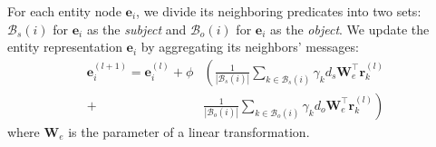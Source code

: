 For each entity node $\mathbf{e}_i$, we divide its neighboring predicates into two sets: $\mathcal{B}_s(i)$ for $\mathbf{e}_i$ as the \textit{subject} and $\mathcal{B}_o(i)$ for $\mathbf{e}_i$ as the \textit{object}.
We update the entity representation $\mathbf{e}_i$ by aggregating its neighbors' messages:
\begin{align}
    \mathbf{e}_i^{(l+1)} = \mathbf{e}_i^{(l)}  +\phi & \left( \frac{1}{|\mathcal{B}_s(i)|}\sum_{k\in\mathcal{B}_{s}(i)} \gamma_{k}  d_{s} \mathbf{W}_e^\intercal\mathbf{r}^{(l)}_{k} \right.\\
     + &\left. \frac{1}{|\mathcal{B}_o(i)|}\sum_{k\in\mathcal{B}_{o}(i)} \gamma_{k}  d_{o}   \mathbf{W}_e^\intercal\mathbf{r}^{(l)}_{k} \right)     
\end{align}
where $\mathbf{W}_e$ is the parameter of a linear transformation.

